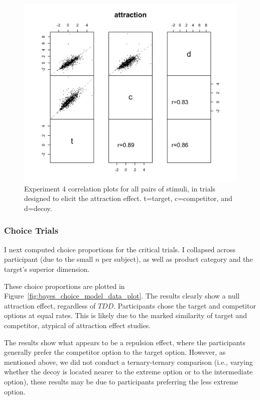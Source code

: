 \begin{figure}
    \includegraphics{figures/price_z_corplot_attraction.jpeg}
    \caption{Experiment 4 correlation plots for all pairs of stimuli, in trials designed to elicit the attraction effect. t=target, c=competitor, and d=decoy.}
    \label{fig:price_z_corplot_attraction}
\end{figure}

\subsubsection{Choice Trials}

I next computed choice proportions for the critical trials. I collapsed across participant (due to the small $n$ per subject), as well as product category and the target's superior dimension.

These choice proportions are plotted in Figure~\ref{fig:bayes_choice_model_data_plot}. The results clearly show a null attraction effect, regardless of $TDD$. Participants chose the target and competitor options at equal rates. This is likely due to the marked similarity of target and competitor, atypical of attraction effect studies. 

The results show what appears to be a repulsion effect, where the participants generally prefer the competitor option to the target option. However, as mentioned above, we did not conduct a ternary-ternary comparison (i.e., varying whether the decoy is located nearer to the extreme option or to the intermediate option), these results may be due to participants preferring the less extreme option.


